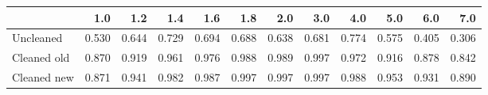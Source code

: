 \begin{tabular}{lrrrrrrrrrrr}
\toprule
{} &   1.0 &   1.2 &   1.4 &   1.6 &   1.8 &   2.0 &   3.0 &   4.0 &   5.0 &   6.0 &   7.0 \\
\midrule
Uncleaned   & 0.530 & 0.644 & 0.729 & 0.694 & 0.688 & 0.638 & 0.681 & 0.774 & 0.575 & 0.405 & 0.306 \\
Cleaned old & 0.870 & 0.919 & 0.961 & 0.976 & 0.988 & 0.989 & 0.997 & 0.972 & 0.916 & 0.878 & 0.842 \\
Cleaned new & 0.871 & 0.941 & 0.982 & 0.987 & 0.997 & 0.997 & 0.997 & 0.988 & 0.953 & 0.931 & 0.890 \\
\bottomrule
\end{tabular}
